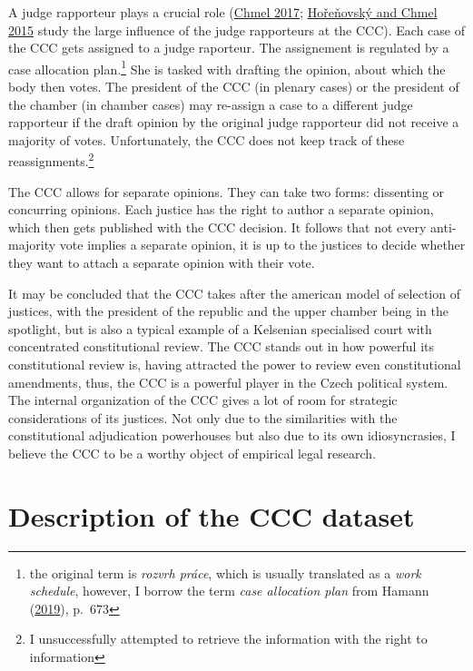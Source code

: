 \documentclass[
  11pt,
]{article}
\begin{document}
A judge rapporteur plays a crucial role
(\protect\hyperlink{ref-chmelZpravodajoveSenatyVliv2017}{Chmel 2017};
\protect\hyperlink{ref-horenovskyProcessMakingConstitutional2015}{Hořeňovský
and Chmel 2015} study the large influence of the judge rapporteurs at
the CCC). Each case of the CCC gets assigned to a judge raporteur. The
assignement is regulated by a case allocation plan.\footnote{the
  original term is \emph{rozvrh práce}, which is usually translated as a
  \emph{work schedule}, however, I borrow the term \emph{case allocation
  plan} from Hamann
  (\protect\hyperlink{ref-hamannGermanFederalCourts2019}{2019}), p.~673}
She is tasked with drafting the opinion, about which the body then
votes. The president of the CCC (in plenary cases) or the president of
the chamber (in chamber cases) may re-assign a case to a different judge
rapporteur if the draft opinion by the original judge rapporteur did not
receive a majority of votes. Unfortunately, the CCC does not keep track
of these reassignments.\footnote{I unsuccessfully attempted to retrieve
  the information with the right to information}

The CCC allows for separate opinions. They can take two forms:
dissenting or concurring opinions. Each justice has the right to author
a separate opinion, which then gets published with the CCC decision. It
follows that not every anti-majority vote implies a separate opinion, it
is up to the justices to decide whether they want to attach a separate
opinion with their vote.

It may be concluded that the CCC takes after the american model of
selection of justices, with the president of the republic and the upper
chamber being in the spotlight, but is also a typical example of a
Kelsenian specialised court with concentrated constitutional review. The
CCC stands out in how powerful its constitutional review is, having
attracted the power to review even constitutional amendments, thus, the
CCC is a powerful player in the Czech political system. The internal
organization of the CCC gives a lot of room for strategic considerations
of its justices. Not only due to the similarities with the
constitutional adjudication powerhouses but also due to its own
idiosyncrasies, I believe the CCC to be a worthy object of empirical
legal research.

\hypertarget{description-of-the-ccc-dataset}{%
\section{Description of the CCC
dataset}\label{description-of-the-ccc-dataset}}
\end{document}
